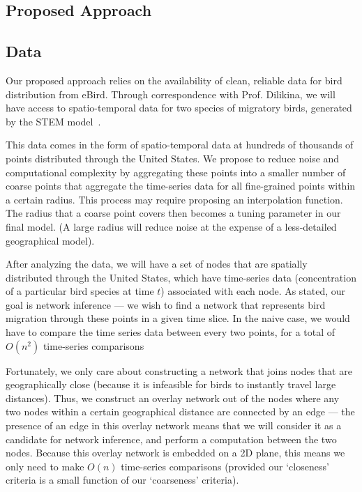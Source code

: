 \documentclass[11pt]{article}
\begin{document}
\begin{multicols}{2}
\section{Proposed Approach} \vspace{-10 pt}
\subsection{Data}
Our proposed approach relies on the availability of clean, reliable data for bird distribution from eBird. Through correspondence with Prof. Dilikina, we will have access to spatio-temporal data for two species of migratory birds, generated by the STEM model~\cite{stem}. 

This data comes in the form of spatio-temporal data at hundreds of thousands of points distributed through the United States. We propose to reduce noise and computational complexity by aggregating these points into a smaller number of coarse points that aggregate the time-series data for all fine-grained points within a certain radius. This process may require proposing an interpolation function. The radius that a coarse point covers then becomes a tuning parameter in our final model. (A large radius will reduce noise at the expense of a less-detailed geographical model). 

After analyzing the data, we will have a set of nodes that are spatially distributed through the United States, which have time-series data (concentration of a particular bird species at time $t$) associated with each node. As stated, our goal is network inference --- we wish to find a network that represents bird migration through these points in a given time slice. In the naive case, we would have to compare the time series data between every two points, for a total of $O(n^2)$ time-series comparisons

Fortunately, we only care about constructing a network that joins nodes that are geographically close (because it is infeasible for birds to instantly travel large distances). Thus, we construct an overlay network out of the nodes where any two nodes within a certain geographical distance are connected by an edge --- the presence of an edge in this overlay network means that we will consider it as a candidate for network inference, and perform a computation between the two nodes. Because this overlay network is embedded on a 2D plane, this means we only need to make $O(n)$ time-series comparisons (provided our `closeness' criteria is a small function of our `coarseness' criteria). 


\end{multicols}
\end{document}
